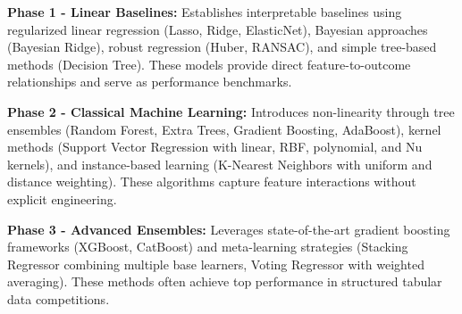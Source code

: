 \documentclass[conference]{IEEEtran}
\begin{document}
\begin{table}[h]
\centering
\caption{Multi-Phase Modeling Framework Overview. The five-phase strategy ensures comprehensive algorithm coverage, from interpretable linear baselines to state-of-the-art deep learning and time-series methods, totaling 40 distinct model evaluations across both 12-week and 24-week prediction tasks.}
\label{tab:phases}
\end{table}

\textbf{Phase 1 - Linear Baselines:} Establishes interpretable baselines using regularized linear regression (Lasso, Ridge, ElasticNet), Bayesian approaches (Bayesian Ridge), robust regression (Huber, RANSAC), and simple tree-based methods (Decision Tree). These models provide direct feature-to-outcome relationships and serve as performance benchmarks.

\textbf{Phase 2 - Classical Machine Learning:} Introduces non-linearity through tree ensembles (Random Forest, Extra Trees, Gradient Boosting, AdaBoost), kernel methods (Support Vector Regression with linear, RBF, polynomial, and Nu kernels), and instance-based learning (K-Nearest Neighbors with uniform and distance weighting). These algorithms capture feature interactions without explicit engineering.

\textbf{Phase 3 - Advanced Ensembles:} Leverages state-of-the-art gradient boosting frameworks (XGBoost, CatBoost) and meta-learning strategies (Stacking Regressor combining multiple base learners, Voting Regressor with weighted averaging). These methods often achieve top performance in structured tabular data competitions.
\end{document}
